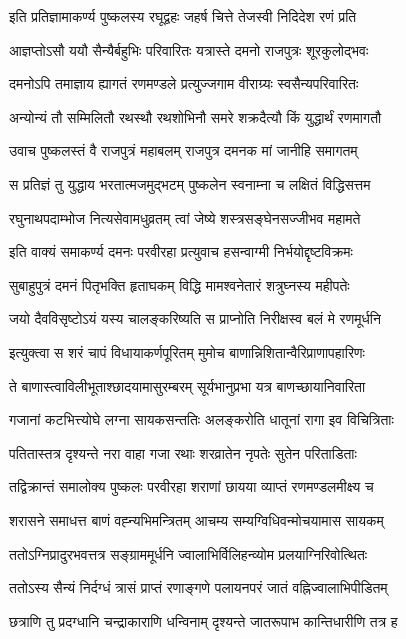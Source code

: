 \twolineshloka
{इति प्रतिज्ञामाकर्ण्य पुष्कलस्य रघूद्वहः}
{जहर्ष चित्ते तेजस्वी निदिदेश रणं प्रति}%

\twolineshloka
{आज्ञप्तोऽसौ ययौ सैन्यैर्बहुभिः परिवारितः}
{यत्रास्ते दमनो राजपुत्रः शूरकुलोद्भवः}%

\twolineshloka
{दमनोऽपि तमाज्ञाय ह्यागतं रणमण्डले}
{प्रत्युज्जगाम वीराग्र्यः स्वसैन्यपरिवारितः}%

\twolineshloka
{अन्योन्यं तौ सम्मिलितौ रथस्थौ रथशोभिनौ}
{समरे शक्रदैत्यौ किं युद्धार्थं रणमागतौ}%

\twolineshloka
{उवाच पुष्कलस्तं वै राजपुत्रं महाबलम्}
{राजपुत्र दमनक मां जानीहि समागतम्}%

\twolineshloka
{स प्रतिज्ञं तु युद्धाय भरतात्मजमुद्भटम्}
{पुष्कलेन स्वनाम्ना च लक्षितं विद्धिसत्तम}%

\twolineshloka
{रघुनाथपदाम्भोज नित्यसेवामधुव्रतम्}
{त्वां जेष्ये शस्त्रसङ्घेनसज्जीभव महामते}%

\twolineshloka
{इति वाक्यं समाकर्ण्य दमनः परवीरहा}
{प्रत्युवाच हसन्वाग्मी निर्भयोद्दृष्टविक्रमः}%

\twolineshloka
{सुबाहुपुत्रं दमनं पितृभक्ति हृताघकम्}
{विद्धि मामश्वनेतारं शत्रुघ्नस्य महीपतेः}%

\twolineshloka
{जयो दैवविसृष्टोऽयं यस्य चालङ्करिष्यति}
{स प्राप्नोति निरीक्षस्व बलं मे रणमूर्धनि}%

\twolineshloka
{इत्युक्त्वा स शरं चापं विधायाकर्णपूरितम्}
{मुमोच बाणान्निशितान्वैरिप्राणापहारिणः}%

\twolineshloka
{ते बाणास्त्वाविलीभूताश्छादयामासुरम्बरम्}
{सूर्यभानुप्रभा यत्र बाणच्छायानिवारिता}%

\twolineshloka
{गजानां कटभित्त्योघे लग्ना सायकसन्ततिः}
{अलङ्करोति धातूनां रागा इव विचित्रिताः}%

\twolineshloka
{पतितास्तत्र दृश्यन्ते नरा वाहा गजा रथाः}
{शरव्रातेन नृपतेः सुतेन परिताडिताः}%

\twolineshloka
{तद्विक्रान्तं समालोक्य पुष्कलः परवीरहा}
{शराणां छायया व्याप्तं रणमण्डलमीक्ष्य च}%

\twolineshloka
{शरासने समाधत्त बाणं वह्न्यभिमन्त्रितम्}
{आचम्य सम्यग्विधिवन्मोचयामास सायकम्}%

\twolineshloka
{ततोऽग्निप्रादुरभवत्तत्र सङ्ग्राममूर्धनि}
{ज्वालाभिर्विलिहन्व्योम प्रलयाग्निरिवोत्थितः}%

\twolineshloka
{ततोऽस्य सैन्यं निर्दग्धं त्रासं प्राप्तं रणाङ्गणे}
{पलायनपरं जातं वह्निज्वालाभिपीडितम्}%

\twolineshloka
{छत्राणि तु प्रदग्धानि चन्द्राकाराणि धन्विनाम्}
{दृश्यन्ते जातरूपाभ कान्तिधारीणि तत्र ह}%

